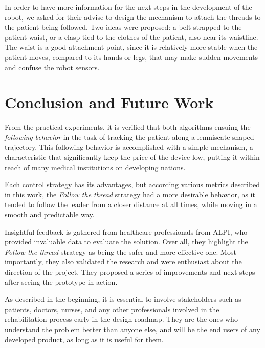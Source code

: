 \documentclass[journal]{IEEEtran}
\begin{document}
In order to have more information for the next steps in the development of the robot, we asked for their advise to design the mechanism to attach the threads to the patient being followed. Two ideas were proposed: a belt strapped to the patient waist, or a clasp tied to the clothes of the patient, also near its waistline. The waist is a good attachment point, since it is relatively more stable when the patient moves, compared to its hands or legs, that may make sudden movements and confuse the robot sensors. 


\section{Conclusion and Future Work}
\label{conclusion}

From the practical experiments, it is verified that both algorithms ensuing the \textit{following behavior}  in the task of tracking the patient along a lemniscate-shaped trajectory. This following behavior is accomplished with a simple mechanism, a characteristic that significantly keep the price of the device low, putting it within reach of many medical institutions on developing nations.

Each control strategy has its advantages, but according various metrics described in this work, the \textit{Follow the thread} strategy had a more desirable behavior, as it tended to follow the leader from a closer distance at all times, while moving in a smooth and predictable way. 

Insightful feedback is gathered from healthcare professionals from ALPI, who provided invaluable data to evaluate the solution. Over all, they highlight the \textit{Follow the thread} strategy as being the safer and more effective one. Most importantly, they also validated the research and were enthusiast about the direction of the project. They proposed a series of improvements and next steps after seeing the prototype in action.

As described in the beginning, it is essential to involve stakeholders such as patients, doctors, nurses, and any other professionals involved in the rehabilitation process early in the design roadmap. They are the ones who understand the problem better than anyone else, and will be the end users of any developed product, as long as it is useful for them.

\end{document}

